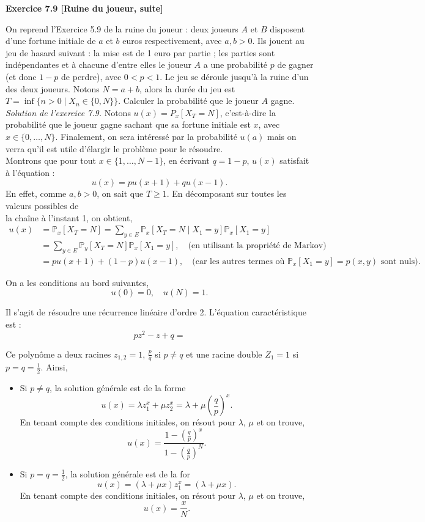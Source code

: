 \noindent \textbf{Exercice 7.9 [Ruine du joueur, suite]}

On reprend l’Exercice 5.9 de la ruine du joueur : deux joueurs $A$ et $B$ disposent d’une fortune initiale de $a$ et $b$ euros respectivement, avec $a, b > 0$. Ils jouent au jeu de hasard suivant : la mise est de 1 euro par partie ; les parties sont indépendantes et à chacune d’entre elles le joueur $A$ a une probabilité $p$ de gagner (et donc $1-p$ de perdre), avec $0 < p < 1$. Le jeu se déroule jusqu’à la ruine d’un des deux joueurs. Notons $N = a + b$, alors la durée du jeu est $T = \inf\{n > 0 \mid X_n \in \{0, N\}\}$. Calculer la probabilité que le joueur $A$ gagne.\\


\noindent \textit{Solution de l’exercice 7.9.} Notons $u(x) = P_x[X_T = N]$, c’est-à-dire la probabilité que le joueur gagne sachant que sa fortune initiale est $x$, avec $x \in \{0, \dots , N\}$. Finalement, on sera intéressé par la probabilité $u(a)$ mais on verra qu’il est utile d’élargir le problème pour le résoudre.\\
Montrons que pour tout $x \in \{1, \dots , N-1\}$, en écrivant $q = 1-p$, $u(x)$ satisfait à l’équation :
$$u(x) = pu(x + 1) + qu(x - 1).$$
En effet, comme $a, b > 0$, on sait que $T \geq 1$. En décomposant sur toutes les valeurs possibles de\\
la chaîne à l’instant 1, on obtient,
\begin{align*}
    u(x) &= \mathbb{P}_x[X_T = N] = \sum_{y \in E} \mathbb{P}_x[X_T = N \mid X_1 = y] \mathbb{P}_x[X_1 = y] \\
    &= \sum_{y \in E} \mathbb{P}_y[X_T = N] \mathbb{P}_x[X_1 = y], \quad \text{(en utilisant la propriété de Markov)} \\
    &= pu(x + 1) + (1-p)u(x-1), \quad \text{(car les autres termes où } \mathbb{P}_x[X_1 = y] = p(x, y) 
    \text{ sont nuls).}
\end{align*}

On a les conditions au bord suivantes,
$$
u(0) = 0, \quad u(N) = 1.
$$

Il s’agit de résoudre une récurrence linéaire d’ordre 2. L’équation caractéristique est :
$$
pz^2 - z + q = 
$$

Ce polynôme a deux racines $z_{1, 2} = 1$, $\frac{p}{q}$ si $p \neq q$ et une racine double $Z_1 = 1$ si $p = q = \frac{1}{2}$. Ainsi,

\begin{itemize}
    \item Si $p \neq q$, la solution générale est de la forme
    $$
    u(x) = \lambda z_1^x + \mu z_2^x = \lambda + \mu(\frac{q}{p})^x.
    $$
    En tenant compte des conditions initiales, on résout pour $\lambda$, $\mu$ et on trouve,
    $$
    u(x) = \frac{1-(\frac{q}{p})^x}{1-(\frac{q}{p})^N}.
    $$

    \item Si $p = q = \frac{1}{2}$, la solution générale est de la for
    $$
    u(x) = (\lambda + \mu x)z^x_1 = (\lambda + \mu x).
    $$
    En tenant compte des conditions initiales, on résout pour $\lambda$, $\mu$ et on trouve,
    $$
    u(x) = \frac{x}{N}.
    $$
\end{itemize}